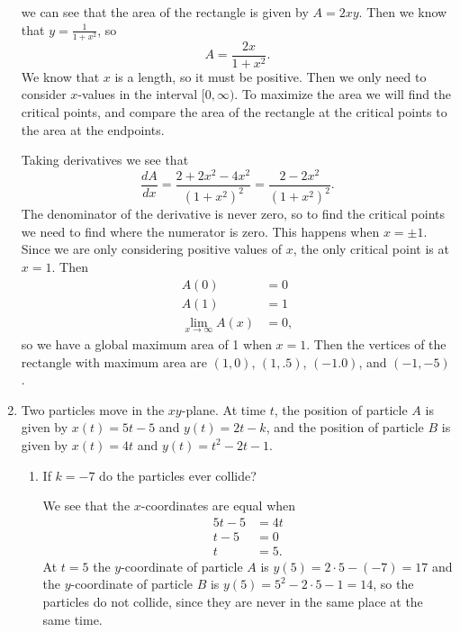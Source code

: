 \documentclass[11pt]{article}
\begin{document}
\begin{enumerate}
{\begin{center}
  \end{center}
  we can see that the area of the rectangle is given by $A=2xy$.  Then
  we know that $y=\frac{1}{1+x^2}$, so
  \[
  A=\frac{2x}{1+x^2}.
  \]
  We know that $x$ is a length, so it must be positive.  Then we only
  need to consider $x$-values in the interval $[0,\infty)$.  To
  maximize the area we will find the critical points, and compare the
  area of the rectangle at the critical points to the area at the
  endpoints.

  Taking derivatives we see that
  \[
  \frac{dA}{dx} = \frac{2+2x^2-4x^2}{(1+x^2)^2} =
  \frac{2-2x^2}{(1+x^2)^2}.
  \]
  The denominator of the derivative is never zero, so to find the
  critical points we need to find where the numerator is zero.  This
  happens when $x=\pm 1$.  Since we are only considering positive
  values of $x$, the only critical point is at $x=1$.  Then
  \begin{align*}
    A(0) &= 0\\
    A(1) &= 1\\
    \lim_{x\to\infty} A(x) &= 0,
  \end{align*}
  so we have a global maximum area of 1 when $x=1$.  Then the vertices
  of the rectangle with maximum area are $(1,0)$, $(1,.5)$, $(-1.0)$,
  and $(-1,-5)$.
  }
  \vfill
  
  \newpage
  
\item Two particles move in the $xy$-plane.  At time $t$, the position
  of particle $A$ is given by $x(t) = 5t - 5$ and $y(t) = 2t - k$, and
  the position of particle $B$ is given by $x(t) = 4t$ and $y(t) = t^2
  - 2t - 1$.
  \begin{enumerate}
  \item If $k=-7$ do the particles ever collide?

    \vfill
    {\color{blue}
    We see that the $x$-coordinates are equal when
    \begin{align*}
      5t-5 &= 4t\\
      t-5 &= 0\\
      t &= 5.
    \end{align*}
    At $t=5$ the $y$-coordinate of particle $A$ is $y(5)=2\cdot 5 -
    (-7)= 17$ and the $y$-coordinate of particle $B$ is
    $y(5)=5^2-2\cdot 5 -1 = 14$, so the particles do not collide,
    since they are never in the same place at the same time.
    }
    \vfill
    

\end{enumerate}
\end{enumerate}
\end{document}
